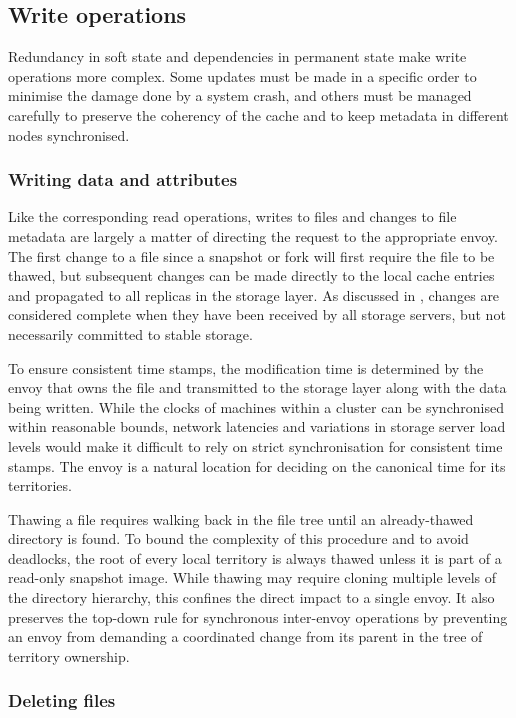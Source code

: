 \subsection{Write operations}

Redundancy in soft state and dependencies in permanent state make write operations more complex. Some updates must be made in a specific order to minimise the damage done by a system crash, and others must be managed carefully to preserve the coherency of the cache and to keep metadata in different nodes synchronised.

\subsubsection{Writing data and attributes}

Like the corresponding read operations, writes to files and changes to file metadata are largely a matter of directing the request to the appropriate envoy. The first change to a file since a snapshot or fork will first require the file to be thawed, but subsequent changes can be made directly to the local cache entries and propagated to all replicas in the storage layer. As discussed in , changes are considered complete when they have been received by all storage servers, but not necessarily committed to stable storage.

To ensure consistent time stamps, the modification time is determined by the envoy that owns the file and transmitted to the storage layer along with the data being written. While the clocks of machines within a cluster can be synchronised within reasonable bounds, network latencies and variations in storage server load levels would make it difficult to rely on strict synchronisation for consistent time stamps. The envoy is a natural location for deciding on the canonical time for its territories.

Thawing a file requires walking back in the file tree until an already-thawed directory is found. To bound the complexity of this procedure and to avoid deadlocks, the root of every local territory is always thawed unless it is part of a read-only snapshot image. While thawing may require cloning multiple levels of the directory hierarchy, this confines the direct impact to a single envoy. It also preserves the top-down rule for synchronous inter-envoy operations by preventing an envoy from demanding a coordinated change from its parent in the tree of territory ownership.

\subsubsection{Deleting files}


